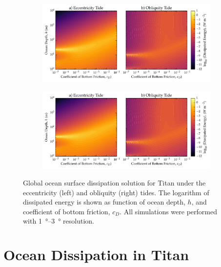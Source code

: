\begin{figure}[!t]
    \centering
    \begin{subfigure}[t]{0.85\linewidth} %
        \includegraphics[width=\linewidth]{Figures/titan_bottom}
        \label{fig:botEccTitan}
    \end{subfigure}
    \begin{subfigure}[t]{0\linewidth} %
         \includegraphics[width=\linewidth]{Figures/titan_bottom}
         \label{fig:botObliqTitan}   
    \end{subfigure}
    \vspace{-0.5cm}
\caption{Global ocean surface dissipation solution for Titan under the eccentricity (left) and obliquity (right) tides. The logarithm of dissipated energy is shown as function of ocean depth, $h$, and coefficient of bottom friction, $c_D$. All simulations were performed with \SIrange{1}{3}{\degree} resolution. \label{fig:botTitan}}
\end{figure}



\section{Ocean Dissipation in Titan \label{sec:results_Titan}}

